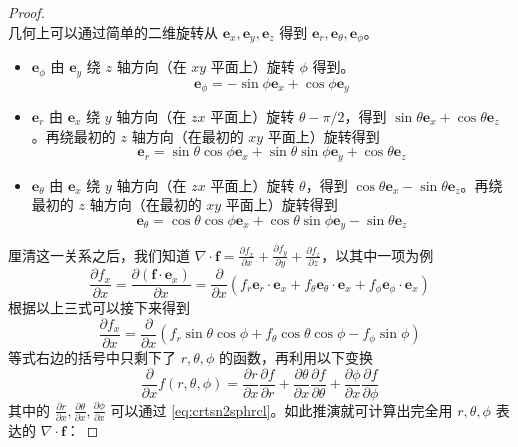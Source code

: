 \documentclass[cn,10pt,math=newtx,citestyle=gb7714-2015,bibstyle=gb7714-2015]{elegantbook}
\def\bm{\boldsymbol}
\def\p{\partial}
\begin{document}
\begin{proof}
\begin{equation*}
    \end{equation*}
    几何上可以通过简单的二维旋转从 $\bm e_x,\bm e_y,\bm e_z$ 得到 $\bm e_r,\bm e_\theta,\bm e_\phi$。
    \begin{itemize}
        \item $\bm e_\phi$ 由 $\bm e_y$ 绕 $z$ 轴方向（在 $xy$ 平面上）旋转 $\phi$ 得到。
        \begin{equation*}
            \bm e_\phi = -\sin\phi\bm e_x + \cos\phi\bm e_y
        \end{equation*}
        \item $\bm e_r$ 由 $\bm e_x$ 绕 $y$ 轴方向（在 $zx$ 平面上）旋转 $\theta-\pi/2$，得到 $\sin\theta\bm e_x+\cos\theta\bm e_z$。再绕最初的 $z$ 轴方向（在最初的 $xy$ 平面上）旋转得到
        \begin{equation*}
            \bm e_r = \sin\theta\cos\phi\bm e_x+\sin\theta\sin\phi\bm e_y+\cos\theta\bm e_z
        \end{equation*}
        \item $\bm e_\theta$ 由 $\bm e_x$ 绕 $y$ 轴方向（在 $zx$ 平面上）旋转 $\theta$，得到 $\cos\theta\bm e_x-\sin\theta\bm e_z$。再绕最初的 $z$ 轴方向（在最初的 $xy$ 平面上）旋转得到
        \begin{equation*}
            \bm e_\theta = \cos\theta\cos\phi\bm e_x+\cos\theta\sin\phi\bm e_y-\sin\theta\bm e_z
        \end{equation*}
    \end{itemize}
    厘清这一关系之后，我们知道 $\nabla\cdot\bm f=\frac{\p f_x}{\p x}+\frac{\p f_y}{\p y}+\frac{\p f_z}{\p z}$，以其中一项为例
    \begin{equation*}
        \frac{\p f_x}{\p x} = \frac{\p(\bm f\cdot\bm e_x)}{\p x}= \frac{\p}{\p x}\left(f_r\bm e_r\cdot\bm e_x + f_\theta\bm e_\theta\cdot\bm e_x+f_\phi\bm e_\phi\cdot\bm e_x\right)
    \end{equation*}
    根据以上三式可以接下来得到
    \begin{equation*}
        \frac{\p f_x}{\p x} = \frac{\p }{\p x}(f_r\sin\theta\cos\phi+f_\theta\cos\theta\cos\phi -f_\phi\sin\phi)
    \end{equation*}
    等式右边的括号中只剩下了 $r,\theta,\phi$ 的函数，再利用以下变换
    \begin{equation*}
        \frac{\p}{\p x} f(r,\theta,\phi) = \frac{\p r}{\p x}\frac{\p f}{\p r} + \frac{\p \theta}{\p x}\frac{\p f}{\p\theta}+\frac{\p\phi}{\p x}\frac{\p f}{\p\phi}
    \end{equation*}
    其中的 $\frac{\p r}{\p x},\frac{\p \theta}{\p x},\frac{\p\phi}{\p x}$ 可以通过 \ref{eq:crtsn2sphrcl}。如此推演就可计算出完全用 $r,\theta,\phi$ 表达的 $\nabla\cdot\bm f$：

\end{proof}
\end{document}
